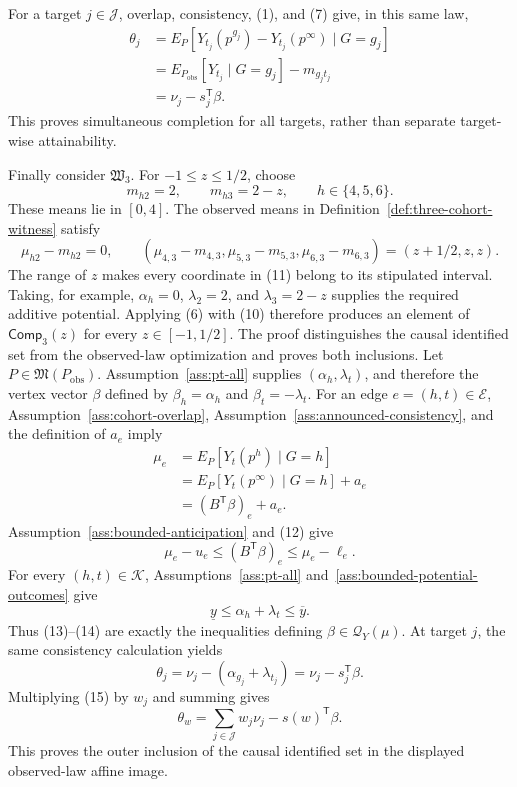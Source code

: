 For a target \(j\in\mathcal J\), overlap, consistency, (1), and (7) give, in this same law,
\[
 \begin{aligned}
 \theta_j
 &=E_P[Y_{t_j}(p^{g_j})-Y_{t_j}(p^\infty)\mid G=g_j]\\
 &=E_{P_{\mathrm{obs}}}[Y_{t_j}\mid G=g_j]-m_{g_jt_j}\\
 &=\nu_j-s_j^{\mathsf T}\beta.
 \end{aligned}
\tag{9}
\]
This proves simultaneous completion for all targets, rather than separate target-wise attainability.

Finally consider \(\mathfrak W_3\).  For \(-1\le z\le1/2\), choose
\[
 m_{h2}=2,
 \qquad m_{h3}=2-z,
 \qquad h\in\{4,5,6\}.
\tag{10}
\]
These means lie in \([0,4]\).  The observed means in Definition~\ref{def:three-cohort-witness} satisfy
\[
 \mu_{h2}-m_{h2}=0,
 \qquad
 (\mu_{4,3}-m_{4,3},\mu_{5,3}-m_{5,3},\mu_{6,3}-m_{6,3})
 =(z+1/2,z,z).
\tag{11}
\]
The range of \(z\) makes every coordinate in (11) belong to its stipulated interval.  Taking, for example, \(\alpha_h=0\), \(\lambda_2=2\), and \(\lambda_3=2-z\) supplies the required additive potential.  Applying (6) with (10) therefore produces an element of \(\mathsf{Comp}_3(z)\) for every \(z\in[-1,1/2]\).
The proof distinguishes the causal identified set from the observed-law optimization and proves both inclusions.  Let \(P\in\mathfrak M(P_{\mathrm{obs}})\).  Assumption~\ref{ass:pt-all} supplies \((\alpha_h,\lambda_t)\), and therefore the vertex vector \(\beta\) defined by \(\beta_h=\alpha_h\) and \(\beta_t=-\lambda_t\).  For an edge \(e=(h,t)\in\mathcal E\), Assumption~\ref{ass:cohort-overlap}, Assumption~\ref{ass:announced-consistency}, and the definition of \(a_e\) imply
\[
 \begin{aligned}
 \mu_e
 &=E_P[Y_t(p^h)\mid G=h]\\
 &=E_P[Y_t(p^\infty)\mid G=h]+a_e\\
 &=(B^{\mathsf T}\beta)_e+a_e.
 \end{aligned}
\tag{12}
\]
Assumption~\ref{ass:bounded-anticipation} and (12) give
\[
 \mu_e-u_e\le(B^{\mathsf T}\beta)_e\le\mu_e-\ell_e.
\tag{13}
\]
For every \((h,t)\in\mathcal K\), Assumptions~\ref{ass:pt-all} and~\ref{ass:bounded-potential-outcomes} give
\[
 \underline y\le\alpha_h+\lambda_t\le\overline y.
\tag{14}
\]
Thus (13)--(14) are exactly the inequalities defining \(\beta\in\mathcal Q_Y(\mu)\).  At target \(j\), the same consistency calculation yields
\[
 \theta_j=\nu_j-(\alpha_{g_j}+\lambda_{t_j})
 =\nu_j-s_j^{\mathsf T}\beta.
\tag{15}
\]
Multiplying (15) by \(w_j\) and summing gives
\[
 \theta_w=\sum_{j\in\mathcal J}w_j\nu_j-s(w)^{\mathsf T}\beta.
\tag{16}
\]
This proves the outer inclusion of the causal identified set in the displayed observed-law affine image.

